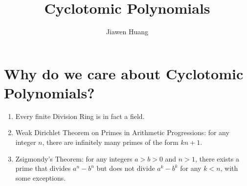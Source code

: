 \documentclass[20pt]{scrartcl}
\begin{document}
\title{Cyclotomic Polynomials}
\date{}
\author{Jiawen Huang}
\maketitle

\section{Why do we care about Cyclotomic Polynomials?}
\begin{enumerate}
    \item Every finite Division Ring is in fact a field.
    \item Weak Dirichlet Theorem on Primes in Arithmetic Progressions: for any integer $n$, there are infinitely many primes of the form $kn+1$.
    \item Zsigmondy's Theorem: for any integers $a > b > 0$ and $n > 1$, there exists a prime that divides $a^n - b^n$ but does not divide $a^k - b^k$ for any $k < n$, with some exceptions.
\end{enumerate}
\end{document}

